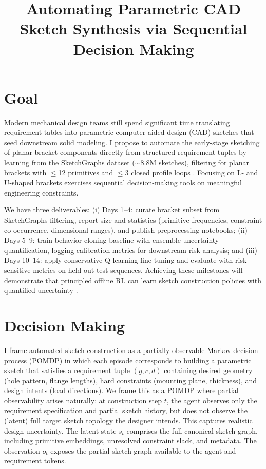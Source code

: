 \documentclass[twoside,11pt]{article}
\begin{document}
\title{Automating Parametric CAD Sketch Synthesis via Sequential Decision Making}
\newcommand{\shorttitle}{Automating CAD Sketches} 


\maketitle

\section{Goal}
Modern mechanical design teams still spend significant time translating requirement tables into parametric computer-aided design (CAD) sketches that seed downstream solid modeling. I propose to automate the early-stage sketching of planar bracket components directly from structured requirement tuples by learning from the SketchGraphs dataset ($\sim$8.8M sketches), filtering for planar brackets with $\leq$12 primitives and $\leq$3 closed profile loops \citep{Willis2021Fusion360, SketchGraphs2020}. Focusing on L- and U-shaped brackets exercises sequential decision-making tools on meaningful engineering constraints.

We have three deliverables: (i) Days 1--4: curate bracket subset from SketchGraphs filtering, report size and statistics (primitive frequencies, constraint co-occurrence, dimensional ranges), and publish preprocessing notebooks; (ii) Days 5--9: train behavior cloning baseline with ensemble uncertainty quantification, logging calibration metrics for downstream risk analysis; and (iii) Days 10--14: apply conservative Q-learning fine-tuning and evaluate with risk-sensitive metrics on held-out test sequences. Achieving these milestones will demonstrate that principled offline RL can learn sketch construction policies with quantified uncertainty \citep{Kochenderfer2022}.


\section{Decision Making}
I frame automated sketch construction as a partially observable Markov decision process (POMDP) in which each episode corresponds to building a parametric sketch that satisfies a requirement tuple $(g, c, d)$ containing desired geometry (hole pattern, flange lengths), hard constraints (mounting plane, thickness), and design intents (load directions). We frame this as a POMDP where partial observability arises naturally: at construction step $t$, the agent observes only the requirement specification and partial sketch history, but does not observe the (latent) full target sketch topology the designer intends. This captures realistic design uncertainty. The latent state $s_t$ comprises the full canonical sketch graph, including primitive embeddings, unresolved constraint slack, and metadata. The observation $o_t$ exposes the partial sketch graph available to the agent and requirement tokens.
\end{document}
